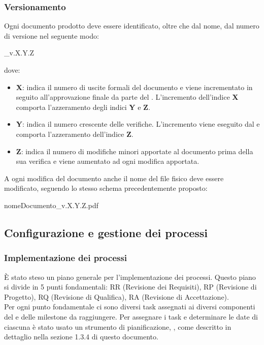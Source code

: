 \subsubsection{Versionamento}
Ogni documento prodotto deve essere identificato, oltre che dal nome, dal numero
di versione nel seguente modo:
\begin{center}
  \_v.X.Y.Z
\end{center}
dove:

\begin{itemize}
  \item \textbf{X}: indica il numero di uscite formali del documento e viene incrementato in seguito all'approvazione finale da parte del \textit{\Pm}.
  L'incremento dell'indice \textbf{X} comporta l'azzeramento degli indici
  \textbf{Y} e \textbf{Z}.
  \item \textbf{Y}: indica il numero crescente delle verifiche. L'incremento viene 	eseguito dal \textit{\Ver} e comporta l'azzeramento dell'indice \textbf{Z}.
  \item \textbf{Z}: indica il numero di modifiche minori apportate al documento
  prima della sua verifica e viene aumentato ad ogni modifica apportata.
  \end{itemize}
A ogni modifica del documento anche il nome del file fisico deve essere
modificato, seguendo lo stesso schema precedentemente proposto:
\begin{center}
  nomeDocumento\_v.X.Y.Z.pdf
\end{center}

\subsection{Configurazione e gestione dei processi}
\subsubsection{Implementazione dei processi}
È stato steso un piano generale per l'implementazione dei processi. Questo piano si divide in 5 punti fondamentali: RR (Revisione dei Requisiti), RP (Revisione di Progetto), RQ (Revisione di Qualifica), RA (Revisione di Accettazione). \\
Per ogni punto fondamentale ci sono diversi task assegnati ai diversi componenti del  e delle milestone da raggiungere. Per assegnare i task e determinare le date di ciascuna  è stato usato un strumento di pianificazione, , come descritto in dettaglio nella sezione 1.3.4 di questo documento.

